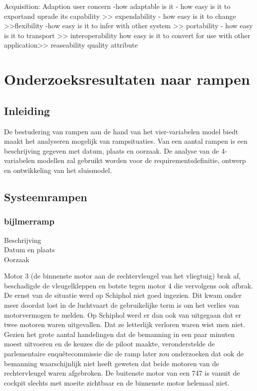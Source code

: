 Acquisition: Adaption
user concern
-how adaptable is it
- how easy is it to exportand uprade its capability >> expendability
- how easy is it to change >>flexibility
-how easy is it to infer with other system >> portability
- how easy is it to transport >> interoperability
how easy is it to convert for use with other application>> reaseability
quality attribute




\section{Onderzoeksresultaten naar rampen}

\subsection{Inleiding}
De bestudering van rampen aan de hand van het vier-variabelen model biedt maakt het analyseren mogelijk van rampsituaties. Van een aantal rampen is een beschrijving gegeven met datum, plaats en oorzaak. De analyse van de 4-variabelen modellen zal gebruikt worden voor de requirementsdefinitie, ontwerp en ontwikkeling van het sluismodel. 
\subsection{Systeemrampen}
\subsubsection{bijlmerramp}

	\begin{description}
	\item[Beschrijving]
	\item[Datum en plaats] 
	\item[Oorzaak]
\end{description}
Motor 3 (de binnenste motor aan de rechtervleugel van het vliegtuig) brak af, beschadigde de vleugelkleppen en botste tegen motor 4 die vervolgens ook afbrak.
De ernst van de situatie werd op Schiphol niet goed ingezien. Dit kwam onder meer doordat lost in de luchtvaart de gebruikelijke term is om het verlies van motorvermogen te melden. Op Schiphol werd er dan ook van uitgegaan dat er twee motoren waren uitgevallen. Dat ze letterlijk verloren waren wist men niet. Gezien het grote aantal handelingen dat de bemanning in een paar minuten moest uitvoeren en de keuzes die de piloot maakte, veronderstelde de parlementaire enquêtecommissie die de ramp later zou onderzoeken dat ook de bemanning waarschijnlijk niet heeft geweten dat beide motoren van de rechtervleugel waren afgebroken. De buitenste motor van een 747 is vanuit de cockpit slechts met moeite zichtbaar en de binnenste motor helemaal niet.


